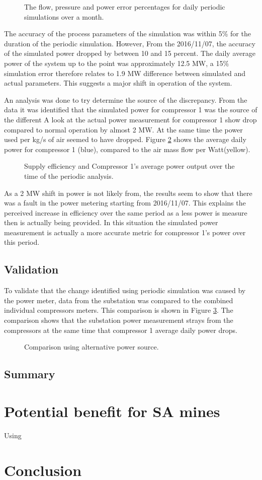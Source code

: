 	\begin{figure}[h]
		\centering
		
		\caption{The flow, pressure and power error percentages for daily periodic simulations over a month.}
		\label{fig: Periodic simulation}
	\end{figure}   
The accuracy of the process parameters of the simulation was within 5\% for the duration of the periodic simulation. However, From the 2016/11/07, the accuracy of the simulated power dropped by between 10 and 15 percent. The daily average power of the system up to the point was approximately 12.5 MW, a 15\% simulation error therefore relates to 1.9 MW difference between simulated and actual parameters. This suggests a major shift in operation of the system.
\par 
An analysis was done to try determine the source of the discrepancy. From the data it was identified that the simulated power for compressor 1 was the source of the different A look at the actual power measurement for compressor 1 show drop compared to normal operation by almost 2 MW. At the same time the power used per kg/s of air seemed to have dropped. Figure \ref{fig: MeasurementAccuracy.} shows the average daily power for compressor 1 (blue), compared to the air mass flow per Watt(yellow). 
	\begin{figure}[h]
		\centering
		
		\caption{Supply efficiency and Compressor 1's average power output over the time of the periodic analysis.}
		\label{fig: MeasurementAccuracy.}
	\end{figure} 
As a 2 MW shift in power is not likely from, the results seem to show that there was a fault in the power metering starting from 2016/11/07. This explains the perceived increase in efficiency over the same period as a less power is measure then is actually being provided. In this situation the simulated power measurement is actually a more accurate metric for compressor 1's power over this period.  
   \subsection{Validation}
To validate that the change identified using periodic simulation was caused by the power meter, data from the substation was compared to the combined individual compressors meters. This comparison is shown in Figure \ref{fig: Corrected Periodic simulation}. The comparison shows that the substation power measurement strays from the compressors at the same time that compressor 1 average daily power drops.
	\begin{figure}[h]
		\centering
		
		\caption{Comparison using alternative power source.}
		\label{fig: Corrected Periodic simulation}
	\end{figure}    
	
	\subsection{Summary}
\newpage
\section{Potential benefit for SA mines}

	Using  
\section{Conclusion}